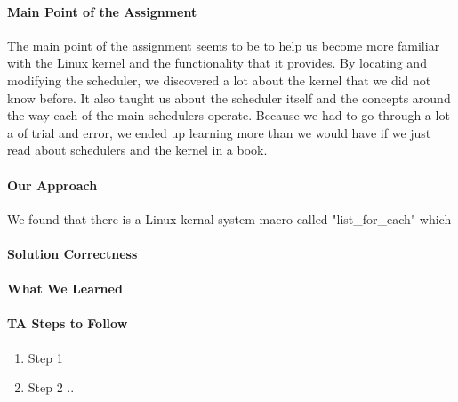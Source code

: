 \documentclass[titlepage,draftclsnofoot,onecolumn]{article}
\begin{document}
\paragraph{Main Point of the Assignment}
The main point of the assignment seems to be to help us become more familiar with the Linux kernel and the functionality that it provides. By locating and modifying the scheduler, we discovered a lot about the kernel that we did not know before. It also taught us about the scheduler itself and the concepts around the way each of the main schedulers operate. Because we had to go through a lot a of trial and error, we ended up learning more than we would have if we just read about schedulers and the kernel in a book.

\paragraph{Our Approach}
We found that there is a Linux kernal system macro called "list_for_each" which 

\paragraph{Solution Correctness}

\paragraph{What We Learned}

\paragraph{TA Steps to Follow}

\begin{enumerate}
  \item Step 1
  \item Step 2 ..
\end{enumerate}
\end{document}
